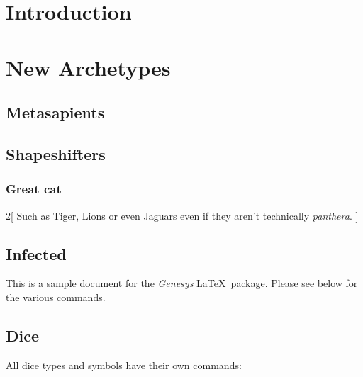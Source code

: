 \documentclass{book}
\begin{document}
\chapter{Introduction}



\chapter{New Archetypes}


\section{Metasapients}


\section{Shapeshifters}

\subsection{Great cat}
\begin{multicols}{2}[
Such as Tiger, Lions or even Jaguars even if they aren't technically \emph{panthera}. ]


\vspace{1em}

\vspace{1em}

\end{multicols}

\section{Infected}



This is a sample document for the \emph{Genesys} \LaTeX\ package. Please see below for the various commands.

\section{Dice}

All dice types and symbols have their own commands:
\end{document}
